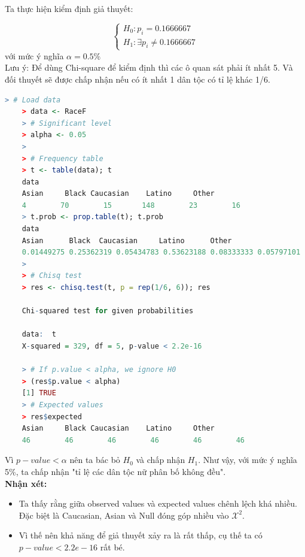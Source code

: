 \documentclass[a4paper,12pt]{article}
\begin{document}
	Ta thực hiện kiểm định giả thuyết:
	
	\begin{equation*}
	\begin{cases}
	H_0: p_i = 0.1666667\\
	H_1:  \exists p_i \neq 0.1666667
	\end{cases}
	\end{equation*}
	với mức ý nghĩa $\alpha = 0.5\%$\\
	
	Lưu ý: Để dùng Chi-square để kiểm định thì các ô quan sát phải ít nhất 5. Và đối thuyết sẽ được chấp nhận nếu có ít nhất 1 dân tộc có tỉ lệ khác 1/6.\\
	
	\begin{lstlisting}[language=R]
	> # Load data
	> data <- RaceF
	> # Significant level
	> alpha <- 0.05
	> 
	> # Frequency table
	> t <- table(data); t
	data
	Asian     Black Caucasian    Latino     Other 
	4        70        15       148        23        16 
	> t.prob <- prop.table(t); t.prob
	data
	Asian      Black  Caucasian     Latino      Other 
	0.01449275 0.25362319 0.05434783 0.53623188 0.08333333 0.05797101 
	> 
	> # Chisq test
	> res <- chisq.test(t, p = rep(1/6, 6)); res
	
	Chi-squared test for given probabilities
	
	data:  t
	X-squared = 329, df = 5, p-value < 2.2e-16
	
	> # If p.value < alpha, we ignore H0
	> (res$p.value < alpha)
	[1] TRUE
	> # Expected values
	> res$expected
	Asian     Black Caucasian    Latino     Other 
	46        46        46        46        46        46 
	\end{lstlisting}
	
	Vì $p-value < \alpha$ nên ta bác bỏ $H_0$ và chấp nhận $H_1$. Như vậy, với mức ý nghĩa 5\%, ta chấp nhận "tỉ lệ các dân tộc nữ phân bố không đều".\\
	
	
	\textbf{Nhận xét:}
	\begin{itemize}
		\item Ta thấy rằng giữa observed values và expected values chênh lệch khá nhiều. Đặc biệt là Caucasian, Asian và Null đóng góp nhiều vào $\mathcal{X}^2$.
		\item Vì thế nên khả năng để giả thuyết xảy ra là rất thấp, cụ thế ta có $p-value < 2.2e-16$ rất bé.
	\end{itemize}
		
\end{document}
